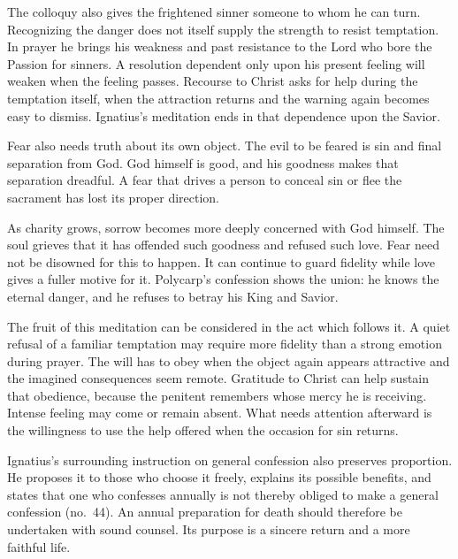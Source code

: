 The colloquy also gives the frightened sinner someone to whom he can turn. Recognizing the danger does not itself supply the strength to resist temptation. In prayer he brings his weakness and past resistance to the Lord who bore the Passion for sinners. A resolution dependent only upon his present feeling will weaken when the feeling passes. Recourse to Christ asks for help during the temptation itself, when the attraction returns and the warning again becomes easy to dismiss. Ignatius's meditation ends in that dependence upon the Savior.

Fear also needs truth about its own object. The evil to be feared is sin and final separation from God. God himself is good, and his goodness makes that separation dreadful. A fear that drives a person to conceal sin or flee the sacrament has lost its proper direction.

As charity grows, sorrow becomes more deeply concerned with God himself. The soul grieves that it has offended such goodness and refused such love. Fear need not be disowned for this to happen. It can continue to guard fidelity while love gives a fuller motive for it. Polycarp's confession shows the union: he knows the eternal danger, and he refuses to betray his King and Savior.

The fruit of this meditation can be considered in the act which follows it. A quiet refusal of a familiar temptation may require more fidelity than a strong emotion during prayer. The will has to obey when the object again appears attractive and the imagined consequences seem remote. Gratitude to Christ can help sustain that obedience, because the penitent remembers whose mercy he is receiving. Intense feeling may come or remain absent. What needs attention afterward is the willingness to use the help offered when the occasion for sin returns.

Ignatius's surrounding instruction on general confession also preserves proportion. He proposes it to those who choose it freely, explains its possible benefits, and states that one who confesses annually is not thereby obliged to make a general confession (no.~44). An annual preparation for death should therefore be undertaken with sound counsel. Its purpose is a sincere return and a more faithful life.

